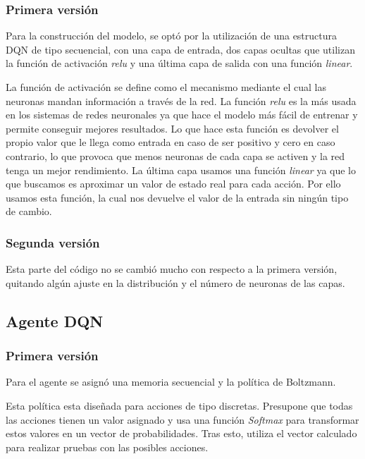 \subsubsection{Primera versión}

Para la construcción del modelo, se optó por la utilización de una estructura DQN de tipo secuencial, con una capa de entrada, dos capas ocultas que utilizan la función de activación \textit{relu} y una última capa de salida con una función \textit{linear}.

La función de activación se define como el mecanismo mediante el cual las neuronas mandan información a través de la red. La función \textit{relu} es la más usada en los sistemas de redes neuronales ya que hace el modelo más fácil de entrenar y permite conseguir mejores resultados.
Lo que hace esta función es devolver el propio valor que le llega como entrada en caso de ser positivo y cero en caso contrario, lo que provoca que menos neuronas de cada capa se activen y la red tenga un mejor rendimiento.
La última capa usamos una función \textit{linear} ya que lo que buscamos es aproximar un valor de estado real para cada acción. Por ello usamos esta función, la cual nos devuelve el valor de la entrada sin ningún tipo de cambio.

\subsubsection{Segunda versión}

Esta parte del código no se cambió mucho con respecto a la primera versión, quitando algún ajuste en la distribución y el número de neuronas de las capas.

\subsection{Agente DQN}

\subsubsection{Primera versión}

Para el agente se asignó una memoria secuencial y la política de Boltzmann\cite{wiki:Boltzmann}.

Esta política esta diseñada para acciones de tipo discretas. Presupone que todas las acciones tienen un valor asignado y usa una función \textit{Softmax} para transformar estos valores en un vector de probabilidades. Tras esto, utiliza el vector calculado para realizar pruebas con las posibles acciones.

